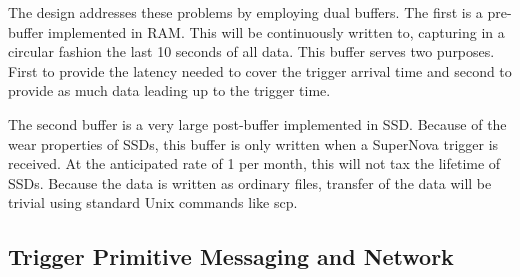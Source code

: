 The design addresses these problems by employing dual buffers. The first is a pre-buffer implemented in RAM.  This will be continuously written to, capturing in a circular fashion the last 10 seconds of all data.  This buffer serves two purposes. First to provide the latency needed to cover the trigger arrival time and second to provide as much data leading up to the trigger time. 

The second buffer is a very large post-buffer implemented in SSD.  Because of the wear properties of SSDs, this buffer is only written when a SuperNova trigger is received. At the anticipated rate of 1 per month, this will not tax the lifetime of SSDs. Because the data is written as ordinary files, transfer of the data will be trivial using standard Unix commands like scp.


\subsection{Trigger Primitive Messaging and Network}







